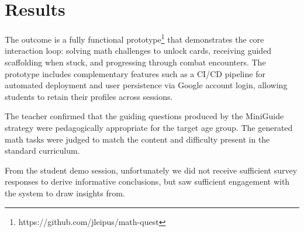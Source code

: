 \section{Results}


The outcome is a fully functional prototype\footnote{https://github.com/jleipus/math-quest} that demonstrates the core interaction loop: solving math challenges to unlock cards, receiving guided scaffolding when stuck, and progressing through combat encounters. The prototype includes complementary features such as a CI/CD pipeline for automated deployment and user persistence via Google account login, allowing students to retain their profiles across sessions.

The teacher confirmed that the guiding questions produced by the MiniGuide strategy were pedagogically appropriate for the target age group. The generated math tasks were judged to match the content and difficulty present in the standard curriculum.

From the student demo session, unfortunately we did not receive sufficient survey responses to derive informative conclusions, but saw sufficient engagement with the system to draw insights from.
